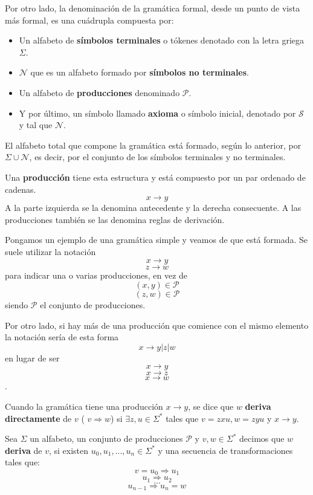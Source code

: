 Por otro lado, la denominación de la gramática formal, desde un punto de vista más formal, es una cuádrupla compuesta por:

\begin{itemize}
	\item Un alfabeto de \textbf{símbolos terminales} o tókenes denotado con la letra griega $\Sigma$.
	\item $\mathcal{N}$ que es un alfabeto formado por \textbf{símbolos no terminales}.
	\item Un alfabeto de \textbf{producciones} denominado $\mathcal{P}$.
	\item Y por último, un símbolo llamado \textbf{axioma} o símbolo inicial, denotado por $\mathcal{S}$ y tal que $\mathcal{N}$.
\end{itemize}

El alfabeto total que compone la gramática está formado, según lo anterior, por $\Sigma\cup\mathcal{N}$, es decir, por el conjunto de los símbolos terminales y no terminales.

Una \textbf{producción} tiene esta estructura y está compuesto por un par ordenado de cadenas. \[x \rightarrow y\] A la parte izquierda se la denomina antecedente y la derecha consecuente. A las producciones también se las denomina reglas de derivación.

Pongamos un ejemplo de una gramática simple y veamos de que está formada. Se suele utilizar la notación  \[x \rightarrow y\] \[z \rightarrow w\] para indicar una o varias producciones, en vez de \[(x, y) \in \mathcal{P} \] \[(z, w) \in \mathcal{P} \] siendo $\mathcal{P}$ el conjunto de producciones.

Por otro lado, si hay más de una producción que comience con el mismo elemento la notación sería de esta forma \[ x \rightarrow y | z | w\] en lugar de ser \[ x \rightarrow y\] \[x \rightarrow z\] \[x \rightarrow w\].

Cuando la gramática tiene una producción $x \rightarrow y$, se dice que $w$ \textbf{deriva directamente} de $v$ ( $v \Rightarrow w$) si $\exists z, u \in \Sigma^{*}$ tales que $v=zxu, w=zyu$ y $x\rightarrow y$.

Sea $\Sigma$ un alfabeto, un conjunto de producciones $\mathcal{P}$ y $v, w \in \Sigma^{*}$ decimos que $w$ \textbf{deriva} de $v$, si existen $u_{0}, u_{1}, ..., u_{n} \in \Sigma^{*}$ y una secuencia de transformaciones tales que:
 \[ v = u_{0} \Rightarrow u_{1}\] \[ u_{1} \Rightarrow u_{2}\] \[...\] \[ u_{n-1} \Rightarrow u_{n} = w\]


